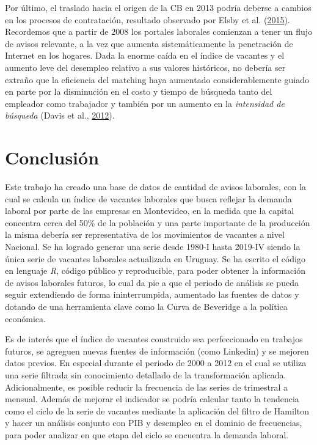 \documentclass[12pt,oneside]{reedthesis}
\begin{document}
Por último, el traslado hacia el origen de la CB en 2013 podría deberse a cambios en los procesos de contratación, resultado observado por Elsby et al. (\protect\hyperlink{ref-Elsby2015}{2015}). Recordemos que a partir de 2008 los portales laborales comienzan a tener un flujo de avisos relevante, a la vez que aumenta sistemáticamente la penetración de Internet en los hogares. Dada la enorme caída en el índice de vacantes y el aumento leve del desempleo relativo a sus valores históricos, no debería ser extraño que la eficiencia del matching haya aumentado considerablemente guiado en parte por la disminución en el costo y tiempo de búsqueda tanto del empleador como trabajador y también por un aumento en la \emph{intensidad de búsqueda} (Davis et al., \protect\hyperlink{ref-Haltiwanger2012}{2012}).

\hypertarget{cap:Conclusiones}{%
\chapter*{Conclusión}\label{cap:Conclusiones}}


Este trabajo ha creado una base de datos de cantidad de avisos laborales, con la cual se calcula un índice de vacantes laborales que busca reflejar la demanda laboral por parte de las empresas en Montevideo, en la medida que la capital concentra cerca del 50\% de la población y una parte importante de la producción la misma debería ser representativa de los movimientos de vacantes a nivel Nacional. Se ha logrado generar una serie desde 1980-I hasta 2019-IV siendo la única serie de vacantes laborales actualizada en Uruguay. Se ha escrito el código en lenguaje \emph{R}, código público y reproducible, para poder obtener la información de avisos laborales futuros, lo cual da pie a que el periodo de análisis se pueda seguir extendiendo de forma ininterrumpida, aumentado las fuentes de datos y dotando de una herramienta clave como la Curva de Beveridge a la política económica.

Es de interés que el índice de vacantes construido sea perfeccionado en trabajos futuros, se agreguen nuevas fuentes de información (como Linkedin) y se mejoren datos previos. En especial durante el periodo de 2000 a 2012 en el cual se utiliza una serie filtrada sin conocimiento detallado de la transformación aplicada. Adicionalmente, es posible reducir la frecuencia de las series de trimestral a mensual. Además de mejorar el indicador se podría calcular tanto la tendencia como el ciclo de la serie de vacantes mediante la aplicación del filtro de Hamilton y hacer un análisis conjunto con PIB y desempleo en el dominio de frecuencias, para poder analizar en que etapa del ciclo se encuentra la demanda laboral.
\end{document}
